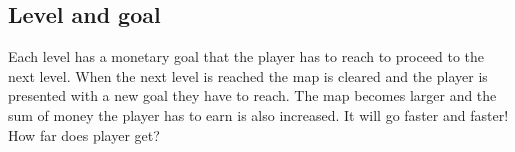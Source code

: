 \subsection*{Level and goal}
    Each level has a monetary goal that the player has to reach to proceed to the next level. When 
    the next level is reached the map is cleared and the player is presented with a new goal they 
    have to reach. The map becomes larger and the sum of money the player has to earn is also increased.
    It will go faster and faster! How far does player get?
